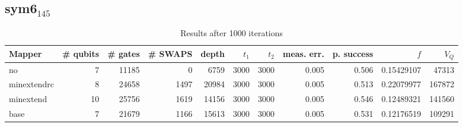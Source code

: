\documentclass[11pt]{article}
\begin{document}
\subsection{sym6\(_{\text{145}}\)}
\label{sec:org7ed33d1}
\begin{table}[H]
\caption{\label{tab:org1fd6681}
Results after 1000 iterations}
\centering
\small
\begin{tabular}{lrrrrrrrrrr}
\hline
Mapper & \# qubits & \# gates & \# SWAPS & depth & \(t_1\) & \(t_2\) & meas. err. & p. success & \(f\) & \(V_Q\)\\
\hline
no & 7 & 11185 & 0 & 6759 & 3000 & 3000 & 0.005 & 0.506 & 0.15429107 & 47313\\
\hline
minextendrc & 8 & 24658 & 1497 & 20984 & 3000 & 3000 & 0.005 & 0.513 & 0.22079977 & 167872\\
minextend & 10 & 25756 & 1619 & 14156 & 3000 & 3000 & 0.005 & 0.546 & 0.12489321 & 141560\\
base & 7 & 21679 & 1166 & 15613 & 3000 & 3000 & 0.005 & 0.531 & 0.12176519 & 109291\\
\hline
\end{tabular}
\end{table}
\end{document}
